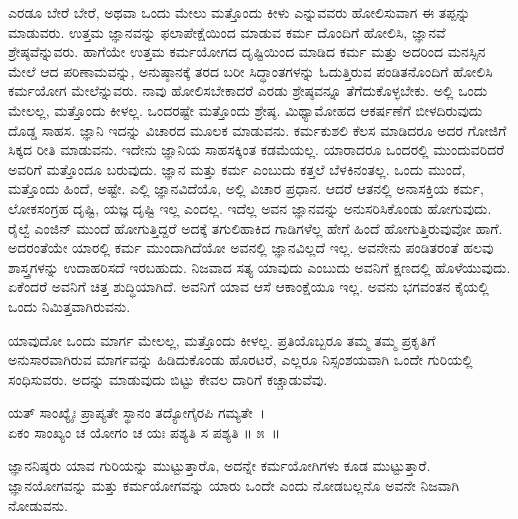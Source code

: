 ಎರಡೂ ಬೇರೆ ಬೇರೆ, ಅಥವಾ ಒಂದು ಮೇಲು ಮತ್ತೊಂದು ಕೀಳು ಎನ್ನುವವರು ಹೋಲಿಸುವಾಗ ಈ ತಪ್ಪನ್ನು ಮಾಡುವರು. ಉತ್ತಮ ಜ್ಞಾನವನ್ನು ಫಲಾಪೇಕ್ಷೆಯಿಂದ ಮಾಡುವ ಕರ್ಮ ದೊಂದಿಗೆ ಹೋಲಿಸಿ, ಜ್ಞಾನವೆ ಶ್ರೇಷ್ಠವೆನ್ನುವರು. ಹಾಗೆಯೇ ಉತ್ತಮ ಕರ್ಮಯೋಗದ ದೃಷ್ಟಿಯಿಂದ ಮಾಡಿದ ಕರ್ಮ ಮತ್ತು ಅದರಿಂದ ಮನಸ್ಸಿನ ಮೇಲೆ ಆದ ಪರಿಣಾಮವನ್ನು, ಅನುಷ್ಠಾನಕ್ಕೆ ತರದ ಬರೀ ಸಿದ್ಧಾಂತಗಳನ್ನು ಓದುತ್ತಿರುವ ಪಂಡಿತನೊಂದಿಗೆ ಹೋಲಿಸಿ ಕರ್ಮಯೋಗ ಮೇಲೆನ್ನುವರು. ನಾವು ಹೋಲಿಸಬೇಕಾದರೆ ಎರಡು ಶ್ರೇಷ್ಠವನ್ನೂ ತೆಗೆದುಕೊಳ್ಳಬೇಕು. ಅಲ್ಲಿ ಒಂದು ಮೇಲಲ್ಲ, ಮತ್ತೊಂದು ಕೀಳಲ್ಲ. ಒಂದರಷ್ಟೇ ಮತ್ತೊಂದು ಶ್ರೇಷ್ಠ. ಮಿಥ್ಯಾಮೋಹದ ಆಕರ್ಷಣೆಗೆ ಬೀಳದಿರುವುದು ದೊಡ್ಡ ಸಾಹಸ. ಜ್ಞಾನಿ ಇದನ್ನು ವಿಚಾರದ ಮೂಲಕ ಮಾಡುವನು. ಕರ್ಮಕುಶಲಿ ಕೆಲಸ ಮಾಡಿದರೂ ಅದರ ಗೋಜಿಗೆ ಸಿಕ್ಕದ ರೀತಿ ಮಾಡುವನು. ಇದೇನು ಜ್ಞಾನಿಯ ಸಾಹಸಕ್ಕಿಂತ ಕಡಮೆಯಲ್ಲ. ಯಾರಾದರೂ ಒಂದರಲ್ಲಿ ಮುಂದುವರಿದರೆ ಅವರಿಗೆ ಮತ್ತೊಂದೂ ಬರುವುದು. ಜ್ಞಾನ ಮತ್ತು ಕರ್ಮ ಎಂಬುದು ಕತ್ತಲೆ ಬೆಳಕಿನಂತಲ್ಲ. ಒಂದು ಮುಂದೆ, ಮತ್ತೊಂದು ಹಿಂದೆ, ಅಷ್ಟೇ. ಎಲ್ಲಿ ಜ್ಞಾನವಿದೆಯೊ, ಅಲ್ಲಿ ವಿಚಾರ ಪ್ರಧಾನ. ಆದರೆ ಆತನಲ್ಲಿ ಅನಾಸಕ್ತಿಯ ಕರ್ಮ, ಲೋಕಸಂಗ್ರಹ ದೃಷ್ಟಿ, ಯಜ್ಞ ದೃಷ್ಟಿ ಇಲ್ಲ ಎಂದಲ್ಲ. ಇದೆಲ್ಲ ಅವನ ಜ್ಞಾನವನ್ನು ಅನುಸರಿಸಿಕೊಂಡು ಹೋಗುವುದು. ರೈಲ್ವೆ ಎಂಜಿನ್ ಮುಂದೆ ಹೋಗುತ್ತಿದ್ದರೆ ಅದಕ್ಕೆ ತಗುಲಿಹಾಕಿದ ಗಾಡಿಗಳೆಲ್ಲ ಹೇಗೆ ಹಿಂದೆ ಹೋಗುತ್ತಿರುವುವೋ ಹಾಗೆ. ಅದರಂತೆಯೇ ಯಾರಲ್ಲಿ ಕರ್ಮ ಮುಂದಾಗಿದೆಯೋ ಅವನಲ್ಲಿ ಜ್ಞಾನವಿಲ್ಲದೆ ಇಲ್ಲ. ಅವನೇನು ಪಂಡಿತರಂತೆ ಹಲವು ಶಾಸ್ತ್ರಗಳನ್ನು ಉದಾಹರಿಸದೆ ಇರಬಹುದು. ನಿಜವಾದ ಸತ್ಯ ಯಾವುದು ಎಂಬುದು ಅವನಿಗೆ ಕ್ಷಣದಲ್ಲಿ ಹೊಳೆಯುವುದು. ಏಕೆಂದರೆ ಅವನಿಗೆ ಚಿತ್ತ ಶುದ್ಧಿಯಾಗಿದೆ. ಅವನಿಗೆ ಯಾವ ಆಸೆ ಆಕಾಂಕ್ಷೆಯೂ ಇಲ್ಲ. ಅವನು ಭಗವಂತನ ಕೈಯಲ್ಲಿ ಒಂದು ನಿಮಿತ್ತವಾಗಿರುವನು.

ಯಾವುದೋ ಒಂದು ಮಾರ್ಗ ಮೇಲಲ್ಲ, ಮತ್ತೊಂದು ಕೀಳಲ್ಲ. ಪ್ರತಿಯೊಬ್ಬರೂ ತಮ್ಮ ತಮ್ಮ ಪ್ರಕೃತಿಗೆ ಅನುಸಾರವಾಗಿರುವ ಮಾರ್ಗವನ್ನು ಹಿಡಿದುಕೊಂಡು ಹೊರಟರೆ, ಎಲ್ಲರೂ ನಿಸ್ಸಂಶಯವಾಗಿ ಒಂದೇ ಗುರಿಯಲ್ಲಿ ಸಂಧಿಸುವರು. ಅದನ್ನು ಮಾಡುವುದು ಬಿಟ್ಟು ಕೇವಲ ದಾರಿಗೆ ಕಚ್ಚಾಡುವೆವು.

\begin{shloka}
ಯತ್ ಸಾಂಖ್ಯೈಃ ಪ್ರಾಪ್ಯತೇ ಸ್ಥಾನಂ ತದ್ಯೋಗೈರಪಿ ಗಮ್ಯತೇ~।\\ಏಕಂ ಸಾಂಖ್ಯಂ ಚ ಯೋಗಂ ಚ ಯಃ ಪಶ್ಯತಿ ಸ ಪಶ್ಯತಿ \hfill॥ ೫~॥
\end{shloka}

\begin{artha}
ಜ್ಞಾನನಿಷ್ಠರು ಯಾವ ಗುರಿಯನ್ನು ಮುಟ್ಟುತ್ತಾರೊ, ಅದನ್ನೇ ಕರ್ಮಯೋಗಿಗಳು ಕೂಡ ಮುಟ್ಟು\-ತ್ತಾರೆ. ಜ್ಞಾನಯೋಗವನ್ನು ಮತ್ತು ಕರ್ಮಯೋಗವನ್ನು ಯಾರು ಒಂದೇ ಎಂದು ನೋಡಬಲ್ಲನೊ ಅವನೇ ನಿಜವಾಗಿ ನೋಡುವನು.
\end{artha}

